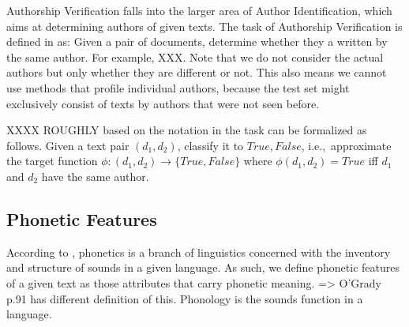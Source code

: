 Authorship Verification falls into the larger area of Author Identification, which aims at determining authors of given texts.
The task of Authorship Verification is defined in \cite{bevendorff2020shared} as: Given a pair of documents, determine whether they a written by the same author.
For example, XXX. Note that we do not consider the actual authors but only whether they are different or not.
This also means we cannot use methods that profile individual authors, because the test set might exclusively consist of texts by authors that were not seen before. %


XXXX ROUGHLY based on the notation in \cite{bevendorff2020shared} the task can be formalized as follows.
Given a text pair $(d_1, d_2)$, classify it to ${True, False}$, i.e.,\ approximate the target function $\phi{}:(d_1, d_2)\to\{True, False\}$ where $\phi(d_1, d_2)=True$ iff $d_1$ and $d_2$ have the same author.

\subsection{Phonetic Features}
According to \cite{ogrady2017introToLinguistics}, phonetics is a branch of linguistics concerned with the inventory and structure of sounds in a given language.
As such, we define phonetic features of a given text as those attributes that carry phonetic meaning.
=> O'Grady p.91 has different definition of this.
Phonology is the sounds function in a language.


